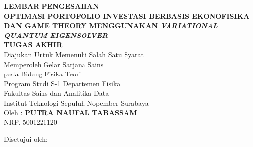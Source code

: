 \begin{center}
\large{\textbf{LEMBAR PENGESAHAN}} \\
\vspace{4mm}
\textbf{OPTIMASI PORTOFOLIO INVESTASI BERBASIS EKONOFISIKA DAN GAME THEORY MENGGUNAKAN \textit{VARIATIONAL QUANTUM EIGENSOLVER}} \\
\vspace{4mm}
\textbf{TUGAS AKHIR} \\
\vspace{4mm}
Diajukan Untuk Memenuhi Salah Satu Syarat \\
Memperoleh Gelar Sarjana Sains \\
pada Bidang Fisika Teori \\
Program Studi S-1 Departemen Fisika \\
Fakultas Sains dan Analitika Data\\
Institut Teknologi Sepuluh Nopember Surabaya \\
\vspace{4mm}
Oleh : \textbf{PUTRA NAUFAL TABASSAM} \\
\vspace{1mm}
NRP. 5001221120 \\
\vspace{4mm}
\begin{center}
	Disetujui oleh:
\end{center}

\vspace{4ex}

\begingroup
\setlength{\tabcolsep}{0pt}


\end{center}
